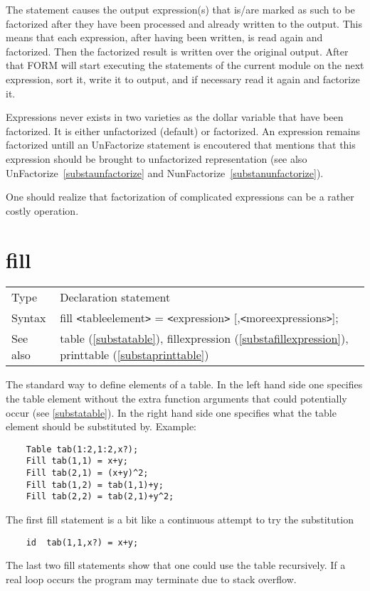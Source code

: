 \noindent The statement causes the output expression(s) that is/are marked 
as such to be factorized after they have been processed and already written 
to the output. This means that each expression, after having been written, 
is read again and factorized. Then the factorized result is written over 
the original output. After that FORM will start executing the statements of 
the current module on the next expression, sort it, write it to output, and 
if necessary read it again and factorize it.

\noindent Expressions never exists in two varieties as the dollar variable 
that have been factorized. It is either unfactorized (default) or 
factorized. An expression remains factorized untill an UnFactorize 
statement is encoutered that mentions that this expression should be 
brought to unfactorized representation (see also 
UnFactorize~\ref{substaunfactorize} and 
NunFactorize~\ref{substanunfactorize}).

\noindent One should realize that factorization of complicated expressions 
can be a rather costly operation.

\vspace{10mm}


\section{fill}
\label{substafill}

\noindent \begin{tabular}{ll}
Type & Declaration statement\\
Syntax & fill {\tt<}tableelement{\tt>} = {\tt<}expression{\tt>} [,{\tt<}moreexpressions{\tt>}];
\\ See also & table (\ref{substatable}), 
                fillexpression (\ref{substafillexpression}),
                printtable (\ref{substaprinttable})
\end{tabular} \vspace{4mm}

\noindent The standard way to define elements of a 
table. In the left hand 
side one specifies the table element without the extra function arguments 
that could potentially occur (see \ref{substatable}). In the right hand 
side one specifies what the table element should be substituted by. 
Example:
\begin{verbatim}
    Table tab(1:2,1:2,x?);
    Fill tab(1,1) = x+y;
    Fill tab(2,1) = (x+y)^2;
    Fill tab(1,2) = tab(1,1)+y;
    Fill tab(2,2) = tab(2,1)+y^2;
\end{verbatim}
The first fill statement is a bit like a continuous attempt to try the 
substitution
\begin{verbatim}
    id  tab(1,1,x?) = x+y;
\end{verbatim}
The last two fill statements show that one could use the table 
recursively. 
If a real loop occurs the program may terminate due to
stack overflow.

